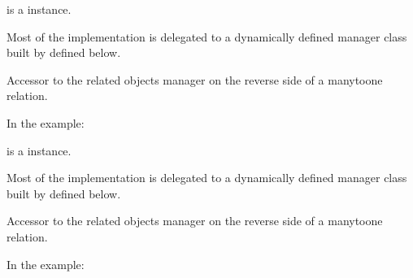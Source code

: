 \documentclass[letterpaper,10pt,english]{sphinxmanual}
\begin{document}
\begin{fulllineitems}
\begin{fulllineitems}
 is a  instance.

Most of the implementation is delegated to a dynamically defined manager
class built by  defined below.

\end{fulllineitems}


\begin{fulllineitems}
\label{\detokenize{accounts:accounts.models.User.likecomment1_set}}
Accessor to the related objects manager on the reverse side of a
many\sphinxhyphen{}to\sphinxhyphen{}one relation.

In the example:

\begin{sphinxVerbatim}[commandchars=\\\{\}]
 
       
\end{sphinxVerbatim}

 is a  instance.

Most of the implementation is delegated to a dynamically defined manager
class built by  defined below.

\end{fulllineitems}


\begin{fulllineitems}
\label{\detokenize{accounts:accounts.models.User.likecomment2_set}}
Accessor to the related objects manager on the reverse side of a
many\sphinxhyphen{}to\sphinxhyphen{}one relation.

In the example:


\end{fulllineitems}
\end{fulllineitems}
\end{document}
